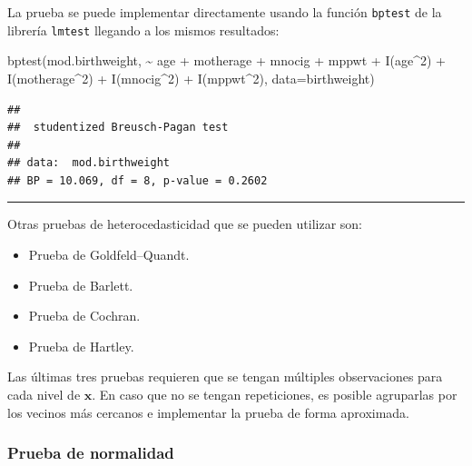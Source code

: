\documentclass[
]{article}
\newenvironment{Shaded}{\begin{snugshade}}{\end{snugshade}}
\newcommand{\AttributeTok}[1]{\textcolor[rgb]{0.77,0.63,0.00}{#1}}
\newcommand{\DecValTok}[1]{\textcolor[rgb]{0.00,0.00,0.81}{#1}}
\newcommand{\FunctionTok}[1]{\textcolor[rgb]{0.00,0.00,0.00}{#1}}
\newcommand{\NormalTok}[1]{#1}
\newcommand{\SpecialCharTok}[1]{\textcolor[rgb]{0.00,0.00,0.00}{#1}}
\providecommand{\tightlist}{%
  \setlength{\itemsep}{0pt}\setlength{\parskip}{0pt}}
\begin{document}
La prueba se puede implementar directamente usando la función \texttt{bptest} de la librería \texttt{lmtest} llegando a los mismos resultados:

\begin{Shaded}
\begin{Highlighting}[]
\FunctionTok{bptest}\NormalTok{(mod.birthweight, }\SpecialCharTok{\textasciitilde{}}\NormalTok{ age }\SpecialCharTok{+}\NormalTok{ motherage }\SpecialCharTok{+}\NormalTok{ mnocig }\SpecialCharTok{+}\NormalTok{ mppwt }\SpecialCharTok{+}
                           \FunctionTok{I}\NormalTok{(age}\SpecialCharTok{\^{}}\DecValTok{2}\NormalTok{) }\SpecialCharTok{+} \FunctionTok{I}\NormalTok{(motherage}\SpecialCharTok{\^{}}\DecValTok{2}\NormalTok{) }\SpecialCharTok{+} \FunctionTok{I}\NormalTok{(mnocig}\SpecialCharTok{\^{}}\DecValTok{2}\NormalTok{) }\SpecialCharTok{+} \FunctionTok{I}\NormalTok{(mppwt}\SpecialCharTok{\^{}}\DecValTok{2}\NormalTok{), }
                         \AttributeTok{data=}\NormalTok{birthweight)}
\end{Highlighting}
\end{Shaded}

\begin{verbatim}
## 
##  studentized Breusch-Pagan test
## 
## data:  mod.birthweight
## BP = 10.069, df = 8, p-value = 0.2602
\end{verbatim}

\rule{\textwidth}{0.4pt}

Otras pruebas de heterocedasticidad que se pueden utilizar son:

\begin{itemize}
\tightlist
\item
  Prueba de Goldfeld--Quandt.
\item
  Prueba de Barlett.
\item
  Prueba de Cochran.
\item
  Prueba de Hartley.
\end{itemize}

Las últimas tres pruebas requieren que se tengan múltiples observaciones para cada nivel de \(\boldsymbol x\). En caso que no se tengan repeticiones, es posible agruparlas por los vecinos más cercanos e implementar la prueba de forma aproximada.

\hypertarget{prueba-de-normalidad}{%
\subsubsection{Prueba de normalidad}\label{prueba-de-normalidad}}
\end{document}
